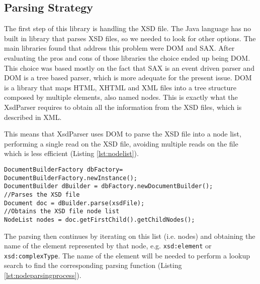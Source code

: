 \subsection{Parsing Strategy}
\label{sec:parsingstrategy}

The first step of this library is handling the \ac{XSD} file. The Java language has no built in library that parses \ac{XSD} files, so we needed to look for other options. The main libraries found that address this problem were \ac{DOM} and \ac{SAX}. After evaluating the pros and cons of those libraries the choice ended up being \ac{DOM}. This choice was based mostly on the fact that \ac{SAX} is an event driven parser and \ac{DOM} is a tree based parser, which is more adequate for the present issue. \ac{DOM} is a library that maps \ac{HTML}, \ac{XHTML} and \ac{XML} files into a tree structure composed by multiple elements, also named nodes. This is exactly what the XsdParser requires to obtain all the information from the \ac{XSD} files, which is described in \ac{XML}. 

\noindent
This means that XsdParser uses \ac{DOM} to parse the \ac{XSD} file into a node list, performing a single read on the \ac{XSD} file, avoiding multiple reads on the file which is less efficient (Listing \ref{lst:nodelist}). 

\bigskip

\begin{minipage}{\linewidth}
\begin{lstlisting}[caption={DOM Document Parsing},captionpos=b,label={lst:nodelist}]
DocumentBuilderFactory dbFactory= DocumentBuilderFactory.newInstance();
DocumentBuilder dBuilder = dbFactory.newDocumentBuilder();
//Parses the XSD file
Document doc = dBuilder.parse(xsdFile);
//Obtains the XSD file node list
NodeList nodes = doc.getFirstChild().getChildNodes();
\end{lstlisting}
\end{minipage}

\newpage

\noindent
The parsing then continues by iterating on this list (i.e. nodes) and obtaining the name of the element represented by that node, e.g. \texttt{xsd:element} or \texttt{xsd:complexType}. The name of the element will be needed to perform a lookup search to find the corresponding parsing function (Listing \ref{lst:nodeparsingprocess}). 

